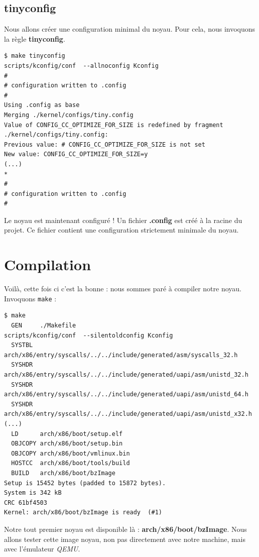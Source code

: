 \documentclass[a4paper]{article}
\begin{document}
\subsection{tinyconfig}

Nous allons créer une configuration minimal du noyau. Pour cela, nous invoquons la règle \textbf{tinyconfig}.

\begin{verbatim}
$ make tinyconfig
scripts/kconfig/conf  --allnoconfig Kconfig
#
# configuration written to .config
#
Using .config as base
Merging ./kernel/configs/tiny.config
Value of CONFIG_CC_OPTIMIZE_FOR_SIZE is redefined by fragment ./kernel/configs/tiny.config:
Previous value: # CONFIG_CC_OPTIMIZE_FOR_SIZE is not set
New value: CONFIG_CC_OPTIMIZE_FOR_SIZE=y
(...)
*
#
# configuration written to .config
#
\end{verbatim}

Le noyau est maintenant configuré ! Un fichier \textbf{.config} est créé à la racine du projet. Ce fichier contient une configuration strictement minimale du noyau.

\section{Compilation}

Voilà, cette fois ci c'est la bonne : nous sommes paré à compiler notre noyau. Invoquons \lstset{language=sh}\lstinline{make} :\\

\begin{verbatim}
$ make
  GEN     ./Makefile
scripts/kconfig/conf  --silentoldconfig Kconfig
  SYSTBL  arch/x86/entry/syscalls/../../include/generated/asm/syscalls_32.h
  SYSHDR  arch/x86/entry/syscalls/../../include/generated/uapi/asm/unistd_32.h
  SYSHDR  arch/x86/entry/syscalls/../../include/generated/uapi/asm/unistd_64.h
  SYSHDR  arch/x86/entry/syscalls/../../include/generated/uapi/asm/unistd_x32.h
(...)
  LD      arch/x86/boot/setup.elf
  OBJCOPY arch/x86/boot/setup.bin
  OBJCOPY arch/x86/boot/vmlinux.bin
  HOSTCC  arch/x86/boot/tools/build
  BUILD   arch/x86/boot/bzImage
Setup is 15452 bytes (padded to 15872 bytes).
System is 342 kB
CRC 61bf4503
Kernel: arch/x86/boot/bzImage is ready  (#1)
\end{verbatim}

Notre tout premier noyau est disponible là : \textbf{arch/x86/boot/bzImage}. Nous allons tester cette image noyau, non pas directement avec notre machine, mais avec l'émulateur \textit{QEMU}.
\end{document}
